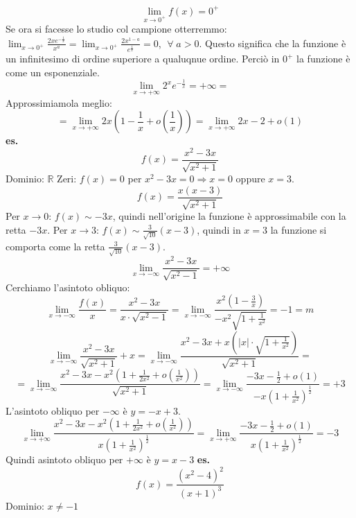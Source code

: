 \[
    \lim_{x\rightarrow 0^+} f(x) = 0^+
\]
Se ora si facesse lo studio col campione otterremmo: $\lim_{x\rightarrow 0^+} \frac{2xe^{-\frac{1}{x}}}{x^a} = \lim_{x\rightarrow 0^+} \frac{2x^{1-a}}{e^{\frac{1}{x}}} = 0$, $\;\forall\;a>0$. Questo significa che la funzione è un infinitesimo di ordine superiore a qualuqnue ordine. Perciò in $0^+$ la funzione è come un esponenziale.
\[
    \lim_{x\rightarrow +\infty} 2^x e ^{-\frac{1}{x}} = + \infty =
\]
Approssimiamola meglio:
\[
    = \lim_{x\rightarrow +\infty}  2x(1- \frac{1}{x} +o(\frac{1}{x})) = \lim_{x\rightarrow +\infty} 2x-2+o(1)
\]
\newline
\newline
\newline
\textbf{es.} 
\[
    f(x) = \frac{x^2-3x}{\sqrt{x^2+1}}
\]
Dominio: $\mathbb{R}$\newline
Zeri: $f(x) = 0$ per $x^2-3x=0 \Rightarrow x=0$ oppure $x=3$.\newline
\[
    f(x) = \frac{x(x-3)}{\sqrt{x^2+1}}
\]
Per $x \rightarrow 0$: $f(x) \sim -3x$, quindi nell'origine la funzione è approssimabile con la retta $-3x$.\newline
Per $x \rightarrow 3$: $f(x) \sim  \frac{3}{\sqrt{10}}(x-3)$, quindi in $x=3$ la funzione si comporta come la retta $\frac{3}{\sqrt{10}}(x-3)$.
\[
    \lim_{x\rightarrow -\infty} \frac{x^2-3x}{\sqrt{x^2-1}} = +\infty
\]
Cerchiamo l'asintoto obliquo:
\[
    \lim_{x\rightarrow -\infty} \frac{f(x)}{x} =  \frac{x^2-3x}{x \cdot \sqrt{x^2-1}} = \lim_{x\rightarrow -\infty} \frac{x^2(1-\frac{3}{x})}{-x^2 \sqrt{1+\frac{1}{x^2}}} = -1 = m
\]
\[
    \lim_{x\rightarrow -\infty} \frac{x^2-3x}{\sqrt{x^2+1}}+x = \lim_{x\rightarrow -\infty} \frac{x^2-3x +x(|x| \cdot  \sqrt{1+ \frac{1}{x^2}})}{\sqrt{x^2+1}} =
\]
\[
    = \lim_{x\rightarrow -\infty} \frac{x^2 -3x -x^2 ( 1 + \frac{1}{2x^2} + o(\frac{1}{x^2}) )}{\sqrt{x^2+1}} = \lim_{x\rightarrow -\infty} \frac{-3x - \frac{1}{2} + o(1)}{-x(1+ \frac{1}{x^2})^{\frac{1}{2}}} = +3
\]
L'asintoto obliquo per $-\infty$ è $y=-x+3$.
\[
    \lim_{x\rightarrow +\infty} \frac{x^2 -3x -x^2(1+ \frac{1}{2x^2} + o(\frac{1}{x^2}))}{x(1+\frac{1}{x^2})^{\frac{1}{2}}} = \lim_{x\rightarrow +\infty} \frac{-3x -\frac{1}{2} + o(1)}{x(1+\frac{1}{x^2})^{\frac{1}{2}}} = -3
\]
Quindi asintoto obliquo per $+ \infty$ è $y=x-3$\newline
\newline
\newline
\newline
\textbf{es.} 
\[
    f(x) = \frac{(x^2-4)^2}{(x+1)^3}
\]
Dominio: $x\neq -1$\newline
